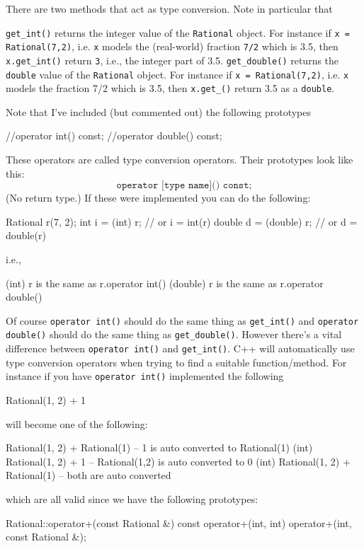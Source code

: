 {There are two methods that act as type conversion.
Note in particular that
\begin{itemize}
\li \texttt{get\_int()} returns the integer value of the \texttt{Rational}
object. For instance if \texttt{x = Rational(7,2)}, i.e. \texttt{x}
models the (real-world) fraction \texttt{7/2} which is 3.5,
then \texttt{x.get\_int()} return \texttt{3}, i.e., the integer part of 3.5.
\li \texttt{get\_double()} returns the \texttt{double} value of the
\texttt{Rational} object. For instance if \texttt{x = Rational(7,2)},
i.e. \texttt{x} models the fraction 7/2 which is 3.5,
then \texttt{x.get\_()} return 3.5 as a \texttt{double}.
\end{itemize}


Note that I've included (but commented out) the following prototypes
\begin{console}
//operator int() const;
//operator double() const;
\end{console}

These operators are called type conversion operators.
Their prototypes look like this:
\[
	\texttt{operator [type name]() const;}
\]
(No return type.)
If these were implemented you can do the following:
\begin{console}
Rational r(7, 2);
int i = (int) r;       // or i = int(r)
double d = (double) r; // or d = double(r)
\end{console}
i.e.,
\begin{console}[commandchars=\\\{\}]
    (int) r       \textrm{is the same as}    r.operator int()
    (double) r    \textrm{is the same as}    r.operator double()
\end{console}


Of course \texttt{operator int()} should do the same thing as
\texttt{get\_int()} and
\texttt{operator double()} should do the same thing as
\texttt{get\_double()}.
However there's a vital difference between
\texttt{operator int()} and \texttt{get\_int()}.
C++ will automatically use type conversion operators when
trying to find a suitable function/method.
For instance if you have \texttt{operator int()} implemented the following
\begin{console}
Rational(1, 2) + 1
\end{console}
will become one of the following:
\begin{console}
Rational(1, 2) + Rational(1)       -- 1 is auto converted to Rational(1)
(int) Rational(1, 2) + 1           -- Rational(1,2) is auto converted to 0
(int) Rational(1, 2) + Rational(1) -- both are auto converted
\end{console}
which are all valid since we have the following prototypes:
\begin{console}
Rational::operator+(const Rational &) const
operator+(int, int)
operator+(int, const Rational &);
\end{console}

}
